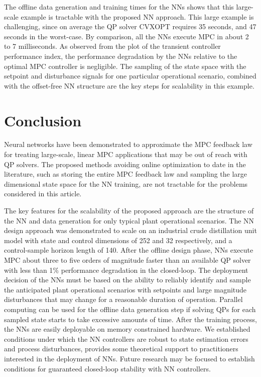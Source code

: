 \documentclass[preprint,5p, twocolumn, authoryear]{elsarticle}
\begin{document}
The offline data generation and training times for the NNs shows that this
large-scale example is tractable with the proposed NN approach. This large
example is challenging, since on average the QP solver CVXOPT requires 35
seconds, and 47 seconds in the worst-case. By comparison,  
all the NNs execute MPC in about 2 to 7 milliseconds. As observed from the plot
of the transient controller performance index, the performance degradation by
the NNs relative to the optimal MPC controller is negligible. The sampling of
the state space with the setpoint and disturbance signals for one particular
operational scenario, combined with the offset-free NN structure are the key
steps for scalability in this example. 

\section{Conclusion} \label{sec:conclusion} 

Neural networks have been demonstrated to approximate the MPC feedback law for
treating large-scale, linear MPC applications that may be out of reach with QP
solvers. The proposed methods avoiding online optimization to date in the
literature, such as storing the entire MPC feedback law and sampling the large
dimensional state space for the NN training, are not tractable for the problems
considered in this article.

The key features for the scalability of the proposed approach are the structure
of the NN and data generation for only typical plant operational scenarios. The
NN design approach was demonstrated to scale on an industrial crude distillation
unit model with state and control dimensions of 252 and 32 respectively, and a
control-sample horizon length of 140. After the offline design phase, NNs
execute MPC about three to five orders of magnitude faster than an available QP
solver with less than 1$\%$ performance degradation in the closed-loop. The
deployment decision of the NNs must be based on the ability to reliably identify
and sample the anticipated plant operational scenarios with setpoints and large
magnitude disturbances that may change for a reasonable duration of operation.
Parallel computing can be used for the offline data generation step if solving
QPs for each sampled state starts to take excessive amounts of time. After the
training process, the NNs are easily deployable on memory constrained hardware.
We established conditions under which the NN controllers are robust to state
estimation errors and process disturbances, provides some theoretical support to
practitioners interested in the deployment of NNs. Future research may be
focused to establish conditions for guaranteed closed-loop stability with NN
controllers.
\end{document}
